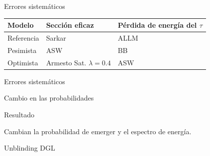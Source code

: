 \begin{frame}{Errores sistem\'aticos}
	\begin{block}{}
		\begin{center}
			\hspace{2mm}
		\end{center}
	\end{block}
	\begin{exampleblock}{}
		\begin{center}
			\begin{tabular}{|l|l|l|}
			\hline
			\textbf{Modelo}      & Secci\'on eficaz& P\'erdida de energ\'ia del $\tau$ \\ 
			\hline
			Referencia &    Sarkar     & ALLM\\ 
			Pesimista &  ASW &     BB\\ 
			Optimista &   Armesto Sat. $\lambda=0.4$&  ASW\\
			\hline 
			\end{tabular}  
		\end{center}
	\end{exampleblock}
\end{frame}

\begin{frame}{Errores sistem\'aticos}
	\begin{block}{Cambio en las probabilidades}
		\begin{center}
		\end{center}
	\end{block}
	\begin{exampleblock}{Resultado}
		\begin{center}
			Cambian la probabilidad de emerger y el espectro de energ\'ia.
		\end{center}
	\end{exampleblock}
\end{frame}


\begin{frame}{Unblinding DGL}
	\begin{center}
	\end{center}
	\begin{block}{}
	\end{block}
\end{frame}


